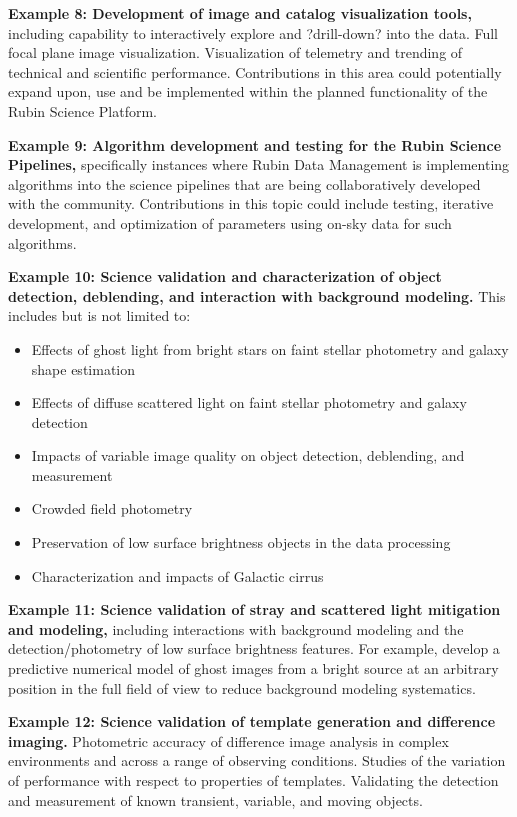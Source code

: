 \documentclass[SE,authoryear,toc,lsstdraft]{lsstdoc}
\begin{document}
\textbf{Example 8: Development of image and catalog visualization tools,} including capability to interactively explore and ?drill-down? into the data. Full focal plane image visualization. Visualization of telemetry and trending of technical and scientific performance. Contributions in this area could potentially expand upon, use and be implemented within the planned functionality of the Rubin Science Platform.

\textbf{Example 9: Algorithm development and testing for the Rubin Science Pipelines,} specifically instances where Rubin Data Management is implementing algorithms into the science pipelines that are being collaboratively developed with the community. Contributions in this topic could include testing, iterative development, and optimization of parameters using on-sky data for such algorithms.

\textbf{Example 10: Science validation and characterization of object detection, deblending, and interaction with background modeling.} This includes but is not limited to:
\begin{itemize}
\item Effects of ghost light from bright stars on faint stellar photometry and galaxy shape estimation
\item Effects of diffuse scattered light on faint stellar photometry and galaxy detection
\item Impacts of variable image quality on object detection, deblending, and measurement
\item Crowded field photometry
\item Preservation of low surface brightness objects in the data processing
\item Characterization and impacts of Galactic cirrus
\end{itemize}

\textbf{Example 11: Science validation of stray and scattered light mitigation and modeling,} including interactions with background modeling and the detection/photometry of low surface brightness features. For example, develop a predictive numerical model of ghost images from a bright source at an arbitrary position in the full field of view to reduce background modeling systematics.

\textbf{Example 12: Science validation of template generation and difference imaging.} Photometric accuracy of difference image analysis in complex environments and across a range of observing conditions. Studies of the variation of performance with respect to properties of templates. Validating the detection and measurement of known transient, variable, and moving objects.
\end{document}
